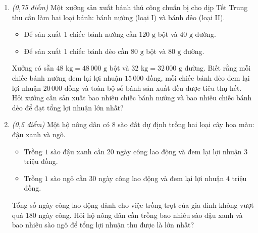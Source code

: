 \documentclass[12pt,a4paper]{article}
\newcommand{\parttitle}[1]{\par\vspace{2pt}{\large\bfseries\color{ink}#1}\par\vspace{1pt}}
\begin{document}
\begin{enumerate}[resume]
\begin{minipage}[t]{0.38\linewidth}
\end{minipage}

\item \textit{(0,75 điểm)} Một xưởng sản xuất bánh thủ công chuẩn bị cho dịp Tết Trung thu cần làm hai loại bánh: bánh nướng (loại I) và bánh dẻo (loại II).
\begin{itemize}[leftmargin=0.5cm]
    \item Để sản xuất 1 chiếc bánh nướng cần $120\text{ g}$ bột và $40\text{ g}$ đường.
    \item Để sản xuất 1 chiếc bánh dẻo cần $80\text{ g}$ bột và $80\text{ g}$ đường.
\end{itemize}
Xưởng có sẵn $48\text{ kg} = 48\,000\text{ g}$ bột và $32\text{ kg} = 32\,000\text{ g}$ đường. Biết rằng mỗi chiếc bánh nướng đem lại lợi nhuận $15\,000$ đồng, mỗi chiếc bánh dẻo đem lại lợi nhuận $20\,000$ đồng và toàn bộ số bánh sản xuất đều được tiêu thụ hết. Hỏi xưởng cần sản xuất bao nhiêu chiếc bánh nướng và bao nhiêu chiếc bánh dẻo để đạt tổng lợi nhuận lớn nhất?

\item \textit{(0,5 điểm)} Một hộ nông dân có $8$ sào đất dự định trồng hai loại cây hoa màu: đậu xanh và ngô.
\begin{itemize}[leftmargin=0.5cm]
    \item Trồng $1$ sào đậu xanh cần $20$ ngày công lao động và đem lại lợi nhuận $3$ triệu đồng.
    \item Trồng $1$ sào ngô cần $30$ ngày công lao động và đem lại lợi nhuận $4$ triệu đồng.
\end{itemize}
Tổng số ngày công lao động dành cho việc trồng trọt của gia đình không vượt quá $180$ ngày công. Hỏi hộ nông dân cần trồng bao nhiêu sào đậu xanh và bao nhiêu sào ngô để tổng lợi nhuận thu được là lớn nhất?
\end{enumerate}

\newpage
\parttitle{BẢNG ĐÁP ÁN TỔNG HỢP}
\end{document}
